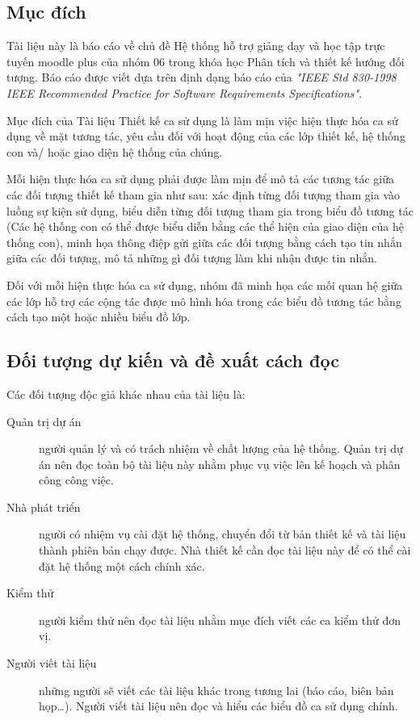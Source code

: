 \documentclass[./../main_file.tex]{subfiles}
\begin{document}
\subsection{Mục đích}

Tài liệu này là báo cáo về chủ đề Hệ thống hỗ trợ giảng dạy và học tập trực tuyến moodle plus của nhóm 06 trong khóa học Phân tích và thiết kế hướng đối tượng.
Báo cáo được viết dựa trên định dạng báo cáo của  \textit{"IEEE Std 830-1998 IEEE Recommended Practice for Software Requirements Specifications"}.


Mục đích của Tài liệu Thiết kế ca sử dụng là làm mịn việc hiện thực hóa ca sử dụng về mặt tương tác, yêu cầu đối với hoạt động của các lớp thiết kế, hệ thống con và/ hoặc giao diện hệ thống của chúng.


Mỗi hiện thực hóa ca sử dụng phải được làm mịn để mô tả các tương tác giữa các đối tượng thiết kế tham gia như sau: xác định từng đối tượng tham gia vào luồng sự kiện sử dụng, biểu diễn từng đối tượng tham gia trong biểu đồ  tương tác (Các hệ thống con có thể được biểu diễn bằng các thể hiện của giao diện của hệ thống con), minh họa thông điệp gửi giữa các đối tượng bằng cách tạo tin nhắn giữa các đối tượng, mô tả những gì đối tượng làm khi nhận được tin nhắn.


Đối với mỗi hiện thực hóa ca sử dụng, nhóm đã minh họa các mối quan hệ giữa các lớp hỗ trợ các cộng tác được mô hình hóa trong các biểu đồ tương tác bằng cách tạo một hoặc nhiều biểu đồ lớp.



\subsection{Đối tượng dự kiến và đề xuất cách đọc}

Các đối tượng độc giả khác nhau của tài liệu là:
\begin{description}
	\item[Quản trị dự án] người quản lý và có trách nhiệm về chất lượng của hệ thống. Quản trị dự án nên đọc toàn bộ tài liệu này nhằm phục vụ việc lên kế hoạch và phân công công việc.
	\item[Nhà phát triển] người có nhiệm vụ cài đặt hệ thống, chuyển đổi từ bản thiết kế và tài liệu thành phiên bản chạy được. Nhà thiết kế cần đọc tài liệu này để có thể cài đặt hệ thống một cách chính xác.
	\item[Kiểm thử] người kiểm thử nên đọc tài liệu nhằm mục đích viết các ca kiểm thử đơn vị.
	\item[Người viết tài liệu] những người sẽ viết các tài liệu khác trong tương lai (báo cáo, biên bản họp…). Người viết tài liệu nên đọc và hiểu các biểu đồ ca sử dụng chính.

\end{description}
\end{document}

